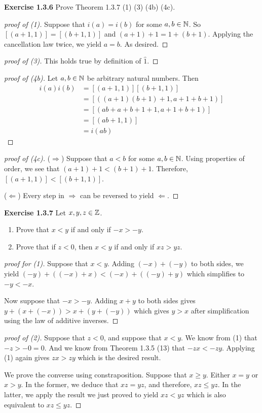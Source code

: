 \noindent \textbf{Exercise 1.3.6} Prove Theorem 1.3.7 (1) (3) (4b) (4c).
\begin{proof}[proof of (1)]
    Suppose that \(i(a) = i(b)\) for some \(a,b \in \mathbb{N}\). So \([(a+1,1)] = [(b+1, 1)]\) and \((a+1) + 1 = 1 + (b+1)\). Applying the cancellation law twice, we yield \(a=b\). As desired.
\end{proof}
\begin{proof}[proof of (3)]
    This holds true by definition of \(\hat{1}\).
\end{proof}
\begin{proof}[proof of (4b)]
    Let \(a,b \in \mathbb{N}\) be arbitrary natural numbers. Then
    \begin{align*}
        i(a)i(b) &= [(a+1, 1)][(b+1, 1)]\\
        &= [((a+1)(b+1) + 1, a+1 + b+1)]\\
        &= [(ab + a + b + 1 + 1, a+1 +  b + 1)]\\
        &= [(ab + 1, 1)] \\
        &= i(ab)
    \end{align*}
\end{proof}
\begin{proof}[proof of (4c)]
    (\(\Longrightarrow\)) Suppose that \(a<b\) for some \(a,b \in \mathbb{N}\). Using properties of order, we see that \((a+1) +1 < (b+1) + 1\).
    Therefore, \([(a+1, 1)] < [(b+1, 1)]\).
    \par (\(\Longleftarrow\)) Every step in \(\Longrightarrow\) can be reversed to yield \(\Longleftarrow\).
\end{proof}


\noindent \textbf{Exercise 1.3.7} Let \(x,y,z \in \mathbb{Z}\).
\begin{enumerate}
    \item Prove that \(x < y\) if and only if \(-x > -y\).
    \item Prove that if \(z < 0\), then \(x<y\) if and only if \(xz > yz\).
\end{enumerate}
\begin{proof}[proof for (1)]
    Suppose that \(x<y\). Adding \((-x) + (-y)\) to both sides, we yield \((-y) + ((-x) + x) < (-x) + ((-y) + y)\) which simplifies to \(-y < -x\).
    \par Now suppose that \(-x > -y\). Adding \(x + y\) to both sides gives \(y + (x + (-x)) > x + (y + (-y))\) which gives \(y > x\) after simplification using the law of additive inverses.
\end{proof}
\begin{proof}[proof of (2)]
    Suppose that \(z < 0\), and suppose that \(x < y\). We know from (1) that \(-z > -0 = 0\). And we know from Theorem 1.3.5 (13) that \(-zx < -zy\). Applying (1) again gives \(zx > zy\) which is the desired result.
    \par We prove the converse using constraposition. Suppose that \(x \geq y\). Either \(x = y\) or \(x > y\). In the former, we deduce that \(xz = yz\), and therefore, \(xz \leq yz\). In the latter, we apply the result we just proved to yield
    \(xz < yz\) which is also equivalent to \(xz \leq yz\).
\end{proof}


